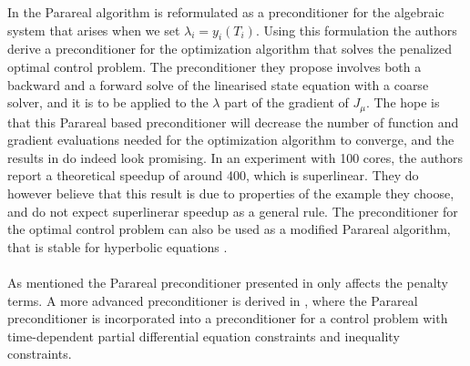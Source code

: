 In \cite{maday2002parareal} the Parareal algorithm is reformulated as a preconditioner for the algebraic system that arises when we set $\lambda_i=y_{i}(T_i)$. Using this formulation the authors derive a preconditioner for the optimization algorithm that solves the penalized optimal control problem. The preconditioner they propose involves both a backward and a forward solve of the linearised state equation with a coarse solver, and it is to be applied to the $\lambda$ part of the gradient of $J_{\mu}$. The hope is that this Parareal based preconditioner will decrease the number of function and gradient evaluations needed for the optimization algorithm to converge, and the results in \cite{maday2002parareal} do indeed look promising. In an experiment with 100 cores, the authors report a theoretical speedup of around 400, which is superlinear. They do however believe that this result is due to properties of the example they choose, and do not expect superlinerar speedup as a general rule. The preconditioner for the optimal control problem can also be used as a modified Parareal algorithm, that is stable for hyperbolic equations \cite{chen2015adjoint}.
\\
\\
As mentioned the Parareal preconditioner presented in \cite{maday2002parareal} only affects the penalty terms. A more advanced preconditioner is derived in \cite{ulbrich2015preconditioners}, where the Parareal preconditioner is incorporated into a preconditioner for a control problem with time-dependent partial differential equation constraints and inequality constraints.
